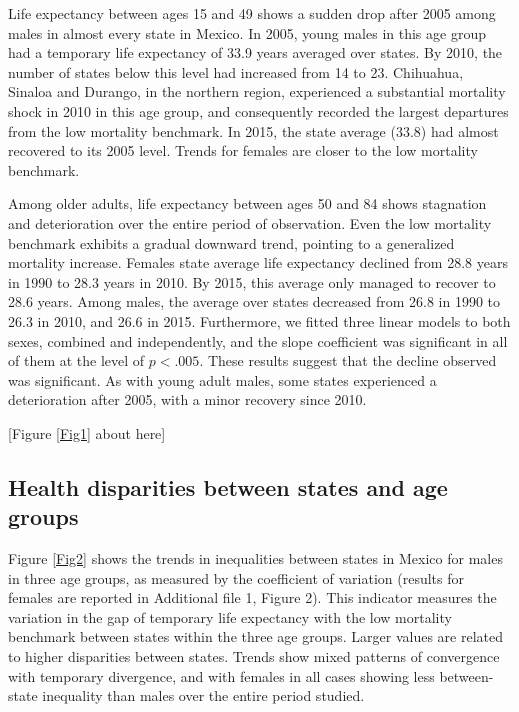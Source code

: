 \documentclass{bmcart}
\begin{document}
Life expectancy between ages 15 and 49 shows a sudden drop after 2005 among males in almost every state in Mexico. In 2005, young males in this age group had a temporary life expectancy of 33.9 years averaged over states. By 2010, the number of states below this level had increased from 14 to 23. Chihuahua, Sinaloa and Durango, in the northern region, experienced a substantial mortality shock in 2010 in this age group, and consequently recorded the largest departures from the low mortality benchmark. In 2015, the state average (33.8) had almost recovered to its 2005 level.
Trends for females are closer to the low mortality benchmark.

Among older adults, life expectancy between ages 50 and 84 shows stagnation and deterioration over the entire period of observation. Even the low mortality benchmark exhibits a gradual downward trend, pointing to a generalized mortality increase. Females state average life expectancy declined from 28.8 years in 1990 to 28.3 years in 2010. By 2015, this average only managed to recover to 28.6 years. Among males, the average over states decreased from 26.8 in 1990 to 26.3 in 2010, and 26.6 in 2015. Furthermore, we fitted three linear models to both sexes, combined and independently, and the slope coefficient was significant in all of them at the level of $p<.005$. These results suggest that the decline observed was significant. As with young adult males, some states experienced a deterioration after 2005, with a minor recovery since 2010.\\

\begin{center}
[Figure \ref{Fig1} about here]
\end{center}

\subsection*{Health disparities between states and age groups}
Figure \ref{Fig2} shows the trends in inequalities between states in Mexico for males in three age groups, as measured by the coefficient of variation (results for females are reported in Additional file 1, Figure 2). This indicator measures the variation in the gap of temporary life expectancy with the low mortality benchmark between states within the three age groups. Larger values are related to higher disparities between states. Trends show mixed patterns of convergence with temporary divergence, and with females in all cases showing less between-state inequality than males over the entire period studied. 
\end{document}
